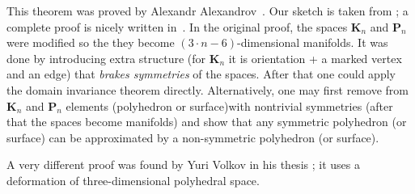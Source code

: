 This theorem was proved by Alexandr Alexandrov~\cite{alexandrov-1941}.
Our sketch is taken from \cite{lebedeva-petrunin};
a complete proof is nicely written in~\cite{alexandrov}.
In the original proof, the spaces $\mathbf{K}_n$ and $\mathbf{P}_n$ were modified so the they become $(3\cdot n-6)$-dimensional manifolds.
It was done by introducing extra structure (for $\mathbf{K}_n$ it is orientation + a marked vertex and an edge) that \textit{brakes symmetries} of the spaces.
After that one could apply the domain invariance theorem directly.
Alternatively, one may first remove from $\mathbf{K}_n$ and $\mathbf{P}_n$ elements (polyhedron or surface)with nontrivial symmetries (after that the spaces become manifolds) and show that any symmetric polyhedron (or surface) can be approximated by a non-symmetric polyhedron (or surface).

A very different proof was found by Yuri Volkov in his thesis \cite{volkov};
it uses a deformation of three-dimensional polyhedral space.

